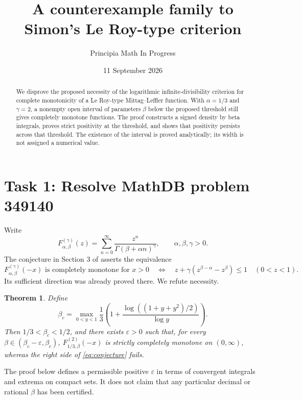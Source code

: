 \documentclass[11pt]{article}
\title{A counterexample family to Simon's Le Roy-type criterion}
\author{Principia Math In Progress}
\date{11 September 2026}
\newtheorem{theorem}{Theorem}
\begin{document}
\maketitle
\begin{abstract}
We disprove the proposed necessity of the logarithmic infinite-divisibility
criterion for complete monotonicity of a Le Roy-type Mittag--Leffler
function. With $\alpha=1/3$ and $\gamma=2$, a nonempty open interval of
parameters $\beta$ below the proposed threshold still gives completely
monotone functions. The proof constructs a signed density by beta
integrals, proves strict positivity at the threshold, and shows that
positivity persists across that threshold. The existence of the interval
is proved analytically; its width is not assigned a numerical value.
\end{abstract}

\section*{Task 1: Resolve MathDB problem 349140}
Write
\[
 F_{\alpha,\beta}^{(\gamma)}(z)
 =\sum_{n=0}^\infty\frac{z^n}{\Gamma(\beta+\alpha n)^\gamma},
 \qquad \alpha,\beta,\gamma>0.
\]
The conjecture in Section 3 of \cite{source} asserts the equivalence
\begin{equation}\label{eq:conjecture}
 F_{\alpha,\beta}^{(\gamma)}(-x)\text{ is completely monotone for }x>0
 \quad\Longleftrightarrow\quad
 z+\gamma(z^{\beta-\alpha}-z^\beta)\leq1\quad(0<z<1).
\end{equation}
Its sufficient direction was already proved there. We refute necessity.

\begin{theorem}\label{thm:counter}
Define
\begin{equation}\label{eq:threshold}
 \beta_c=\max_{0<y<1}
 \frac13\left(1+\frac{\log((1+y+y^2)/2)}{\log y}\right).
\end{equation}
Then $1/3<\beta_c<1/2$, and there exists $\varepsilon>0$ such that,
for every $\beta\in(\beta_c-\varepsilon,\beta_c)$,
$F_{1/3,\beta}^{(2)}(-x)$ is strictly completely monotone on $(0,\infty)$,
whereas the right side of \eqref{eq:conjecture} fails.
\end{theorem}
The proof below defines a permissible positive $\varepsilon$ in terms of
convergent integrals and extrema on compact sets. It does not claim that
any particular decimal or rational $\beta$ has been certified.
\end{document}
